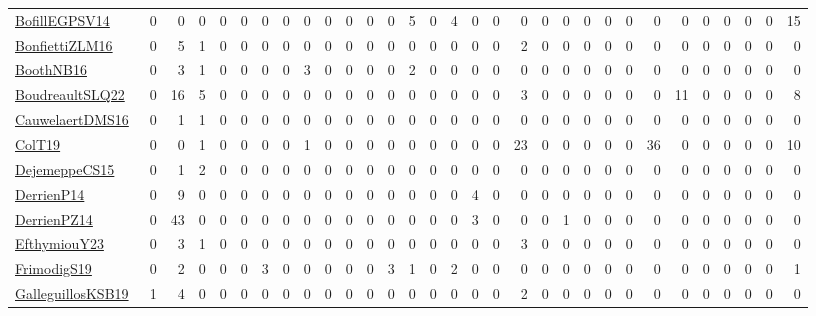 \documentclass[a4paper]{article}
\begin{document}
{\begin{longtable}{l*{30}{r}}
\href{papers/BofillEGPSV14.pdf}{BofillEGPSV14}~\cite{BofillEGPSV14} & 0 & 0 & 0 & 0 & 0 & 0 & 0 & 0 & 0 & 0 & 0 & 0 & 5 & 0 & 4 & 0 & 0 & 0 & 0 & 0 & 0 & 0 & 0 & 0 & 0 & 0 & 0 & 0 & 0 & 15\\
\href{papers/BonfiettiZLM16.pdf}{BonfiettiZLM16}~\cite{BonfiettiZLM16} & 0 & 5 & 1 & 0 & 0 & 0 & 0 & 0 & 0 & 0 & 0 & 0 & 0 & 0 & 0 & 0 & 0 & 2 & 0 & 0 & 0 & 0 & 0 & 0 & 0 & 0 & 0 & 0 & 0 & 0\\
\href{papers/BoothNB16.pdf}{BoothNB16}~\cite{BoothNB16} & 0 & 3 & 1 & 0 & 0 & 0 & 0 & 3 & 0 & 0 & 0 & 0 & 2 & 0 & 0 & 0 & 0 & 0 & 0 & 0 & 0 & 0 & 0 & 0 & 0 & 0 & 0 & 0 & 0 & 0\\
\href{papers/BoudreaultSLQ22.pdf}{BoudreaultSLQ22}~\cite{BoudreaultSLQ22} & 0 & 16 & 5 & 0 & 0 & 0 & 0 & 0 & 0 & 0 & 0 & 0 & 0 & 0 & 0 & 0 & 0 & 3 & 0 & 0 & 0 & 0 & 0 & 0 & 11 & 0 & 0 & 0 & 0 & 8\\
\href{papers/CauwelaertDMS16.pdf}{CauwelaertDMS16}~\cite{CauwelaertDMS16} & 0 & 1 & 1 & 0 & 0 & 0 & 0 & 0 & 0 & 0 & 0 & 0 & 0 & 0 & 0 & 0 & 0 & 0 & 0 & 0 & 0 & 0 & 0 & 0 & 0 & 0 & 0 & 0 & 0 & 0\\
\href{papers/ColT19.pdf}{ColT19}~\cite{ColT19} & 0 & 0 & 1 & 0 & 0 & 0 & 0 & 1 & 0 & 0 & 0 & 0 & 0 & 0 & 0 & 0 & 0 & 23 & 0 & 0 & 0 & 0 & 0 & 36 & 0 & 0 & 0 & 0 & 0 & 10\\
\href{papers/DejemeppeCS15.pdf}{DejemeppeCS15}~\cite{DejemeppeCS15} & 0 & 1 & 2 & 0 & 0 & 0 & 0 & 0 & 0 & 0 & 0 & 0 & 0 & 0 & 0 & 0 & 0 & 0 & 0 & 0 & 0 & 0 & 0 & 0 & 0 & 0 & 0 & 0 & 0 & 0\\
\href{papers/DerrienP14.pdf}{DerrienP14}~\cite{DerrienP14} & 0 & 9 & 0 & 0 & 0 & 0 & 0 & 0 & 0 & 0 & 0 & 0 & 0 & 0 & 0 & 4 & 0 & 0 & 0 & 0 & 0 & 0 & 0 & 0 & 0 & 0 & 0 & 0 & 0 & 0\\
\href{papers/DerrienPZ14.pdf}{DerrienPZ14}~\cite{DerrienPZ14} & 0 & 43 & 0 & 0 & 0 & 0 & 0 & 0 & 0 & 0 & 0 & 0 & 0 & 0 & 0 & 3 & 0 & 0 & 0 & 1 & 0 & 0 & 0 & 0 & 0 & 0 & 0 & 0 & 0 & 0\\
\href{papers/EfthymiouY23.pdf}{EfthymiouY23}~\cite{EfthymiouY23} & 0 & 3 & 1 & 0 & 0 & 0 & 0 & 0 & 0 & 0 & 0 & 0 & 0 & 0 & 0 & 0 & 0 & 3 & 0 & 0 & 0 & 0 & 0 & 0 & 0 & 0 & 0 & 0 & 0 & 0\\
\href{papers/FrimodigS19.pdf}{FrimodigS19}~\cite{FrimodigS19} & 0 & 2 & 0 & 0 & 0 & 3 & 0 & 0 & 0 & 0 & 0 & 3 & 1 & 0 & 2 & 0 & 0 & 0 & 0 & 0 & 0 & 0 & 0 & 0 & 0 & 0 & 0 & 0 & 0 & 1\\
\href{papers/GalleguillosKSB19.pdf}{GalleguillosKSB19}~\cite{GalleguillosKSB19} & 1 & 4 & 0 & 0 & 0 & 0 & 0 & 0 & 0 & 0 & 0 & 0 & 0 & 0 & 0 & 0 & 0 & 2 & 0 & 0 & 0 & 0 & 0 & 0 & 0 & 0 & 0 & 0 & 0 & 0\\

\end{longtable}}
\end{document}
